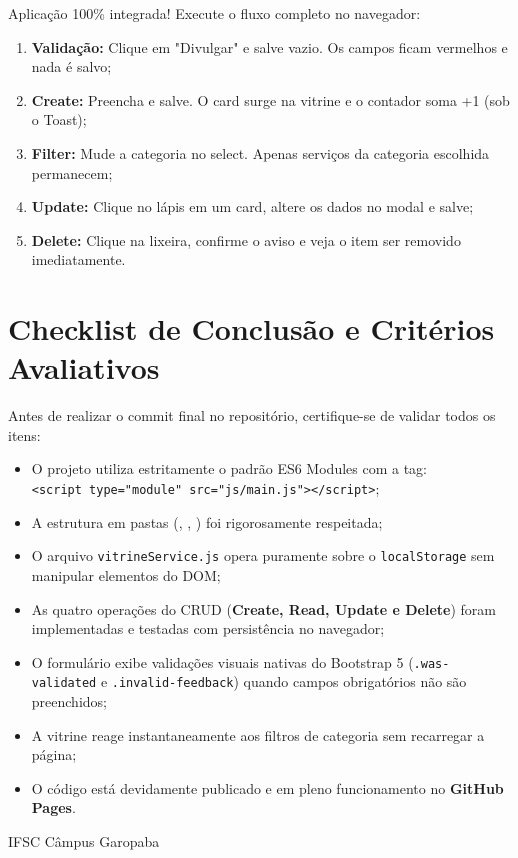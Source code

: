 \vspace{-0.15cm}
\begin{boxTeste}
Aplicação 100\% integrada! Execute o fluxo completo no navegador:
\begin{enumerate}[leftmargin=*, nosep]
  \item \textbf{Validação:} Clique em "Divulgar" e salve vazio. Os campos ficam vermelhos e nada é salvo;
  \item \textbf{Create:} Preencha e salve. O card surge na vitrine e o contador soma +1 (sob o Toast);
  \item \textbf{Filter:} Mude a categoria no select. Apenas serviços da categoria escolhida permanecem;
  \item \textbf{Update:} Clique no lápis em um card, altere os dados no modal e salve;
  \item \textbf{Delete:} Clique na lixeira, confirme o aviso e veja o item ser removido imediatamente.
\end{enumerate}
\end{boxTeste}


\clearpage
\section{Checklist de Conclusão e Critérios Avaliativos}\label{sec:m4a}

Antes de realizar o commit final no repositório, certifique-se de validar todos os itens:

\begin{checklist}
\begin{itemize}
\item[\caixaMarcar] O projeto utiliza estritamente o padrão ES6 Modules com a tag:\\ \texttt{<script type="module" src="js/main.js"></script>};
\item[\caixaMarcar] A estrutura em pastas (, , ) foi rigorosamente respeitada;
\item[\caixaMarcar] O arquivo \texttt{vitrineService.js} opera puramente sobre o \texttt{localStorage} sem manipular elementos do DOM;
\item[\caixaMarcar] As quatro operações do CRUD (\textbf{Create, Read, Update e Delete}) foram implementadas e testadas com persistência no navegador;
\item[\caixaMarcar] O formulário exibe validações visuais nativas do Bootstrap 5 (\texttt{.was-validated} e \texttt{.invalid-feedback}) quando campos obrigatórios não são preenchidos;
\item[\caixaMarcar] A vitrine reage instantaneamente aos filtros de categoria sem recarregar a página;
\item[\caixaMarcar] O código está devidamente publicado e em pleno funcionamento no \textbf{GitHub Pages}.
\end{itemize}
\end{checklist}

\vfill
{\centering\footnotesize\color{suave}\faMapMarkerAlt\hspace{0.4em}IFSC Câmpus Garopaba\par}
